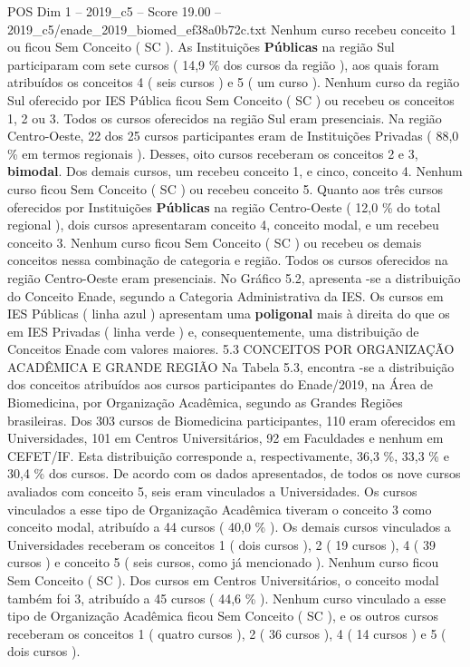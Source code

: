 \begin{textsample}{POS Dim 1 – 2019\_c5 – Score 19.00 – 2019\_c5/enade\_2019\_biomed\_ef38a0b72c.txt}
Nenhum curso recebeu conceito 1 ou ficou Sem Conceito ( SC ).
As Instituições \textbf{Públicas} na região Sul participaram com sete cursos ( 14,9 \% dos cursos da região ), aos quais foram atribuídos os conceitos 4 ( seis cursos ) e 5 ( um curso ).
Nenhum curso da região Sul oferecido por IES Pública ficou Sem Conceito ( SC ) ou recebeu os conceitos 1, 2 ou 3.
Todos os cursos oferecidos na região Sul eram presenciais.
Na região Centro-Oeste, 22 dos 25 cursos participantes eram de Instituições Privadas ( 88,0 \% em termos regionais ).
Desses, oito cursos receberam os conceitos 2 e 3, \textbf{bimodal}.
Dos demais cursos, um recebeu conceito 1, e cinco, conceito 4.
Nenhum curso ficou Sem Conceito ( SC ) ou recebeu conceito 5.
Quanto aos três cursos oferecidos por Instituições \textbf{Públicas} na região Centro-Oeste ( 12,0 \% do total regional ), dois cursos apresentaram conceito 4, conceito modal, e um recebeu conceito 3.
Nenhum curso ficou Sem Conceito ( SC ) ou recebeu os demais conceitos nessa combinação de categoria e região.
Todos os cursos oferecidos na região Centro-Oeste eram presenciais.
No Gráfico 5.2, apresenta -se a distribuição do Conceito Enade, segundo a Categoria Administrativa da IES.
Os cursos em IES Públicas ( linha azul ) apresentam uma \textbf{poligonal} mais à direita do que os em IES Privadas ( linha verde ) e, consequentemente, uma distribuição de Conceitos Enade com valores maiores. 5.3 CONCEITOS POR ORGANIZAÇÃO ACADÊMICA E GRANDE REGIÃO Na Tabela 5.3, encontra -se a distribuição dos conceitos atribuídos aos cursos participantes do Enade/2019, na Área de Biomedicina, por Organização Acadêmica, segundo as Grandes Regiões brasileiras.
Dos 303 cursos de Biomedicina participantes, 110 eram oferecidos em Universidades, 101 em Centros Universitários, 92 em Faculdades e nenhum em CEFET/IF.
Esta distribuição corresponde a, respectivamente, 36,3 \%, 33,3 \% e 30,4 \% dos cursos.
De acordo com os dados apresentados, de todos os nove cursos avaliados com conceito 5, seis eram vinculados a Universidades.
Os cursos vinculados a esse tipo de Organização Acadêmica tiveram o conceito 3 como conceito modal, atribuído a 44 cursos ( 40,0 \% ).
Os demais cursos vinculados a Universidades receberam os conceitos 1 ( dois cursos ), 2 ( 19 cursos ), 4 ( 39 cursos ) e conceito 5 ( seis cursos, como já mencionado ).
Nenhum curso ficou Sem Conceito ( SC ).
Dos cursos em Centros Universitários, o conceito modal também foi 3, atribuído a 45 cursos ( 44,6 \% ).
Nenhum curso vinculado a esse tipo de Organização Acadêmica ficou Sem Conceito ( SC ), e os outros cursos receberam os conceitos 1 ( quatro cursos ), 2 ( 36 cursos ), 4 ( 14 cursos ) e 5 ( dois cursos ).

\end{textsample}
